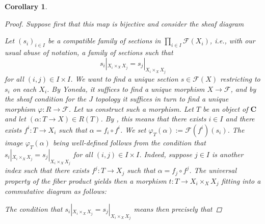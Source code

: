 \documentclass[12pt,reqno,a4paper]{amsart}
\theoremstyle{plain}
\newtheorem{cor}[thm]{Corollary}
\theoremstyle{definition}
\theoremstyle{remark}
\begin{document}
\begin{cor}
\begin{proof}
    Suppose first that this map is bijective and consider the sheaf diagram
    \begin{center}
    \end{center}
    Let $(s_{i})_{i \in I}$ be a compatible family of sections in $\prod_{i \in I} \mathscr{F}(X_{i})$, i.e., with our usual abuse of notation, a family of sections such that
    \[ s_{i}|_{X_{i} \times_{X} X_{j}} = s_{j}|_{X_{i} \times_{X} X_{j}} \]
    for all $(i,j) \in I \times I$.
    We want to find a unique section $s \in \mathscr{F}(X)$ restricting to $s_{i}$ on each $X_{i}$.
    By Yoneda, it suffices to find a unique morphism $X \to \mathscr{F}$, and by the sheaf condition for the $J$ topology it suffices in turn to find a unique morphism $\varphi \colon R \to \mathscr{F}$.
    Let us construct such a morphism.
    Let $T$ be an object of $\mathbf{C}$ and let $(\alpha \colon T \to X) \in R(T)$.
    By , this means that there exists $i \in I$ and there exists $f^{i} \colon T \to X_{i}$ such that $\alpha = f_{i} \circ f^{i}$.
    We set $\varphi_{T}(\alpha) := \mathscr{F}(f^{i})(s_{i})$.
    The image $\varphi_{T}(\alpha)$ being well-defined follows from the condition that $s_{i}|_{X_{i} \times_{X} X_{j}} = s_{j}|_{X_{i} \times_{X} X_{j}}$ for all $(i, j) \in I \times I$.
    Indeed, suppose $j \in I$ is another index such that there exists $f^{j} \colon T \to X_{j}$ such that $\alpha = f_{j} \circ f^{j}$.
    The universal property of the fiber product yields then a morphism $t \colon T \to X_{i} \times_{X} X_{j}$ fitting into a commutative diagram as follows:
    \begin{center}
    \end{center}
    The condition that $s_{i}|_{X_{i} \times_{X} X_{j}} = s_{j}|_{X_{i} \times_{X} X_{j}}$ means then precisely that

\end{proof}
\end{cor}
\end{document}
